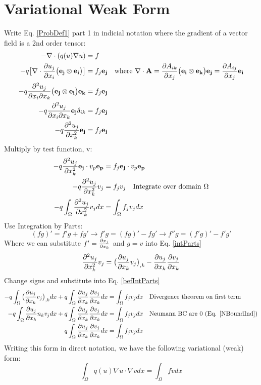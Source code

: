 \documentclass[12pt,3p]{article}
\begin{document}
\section{Variational Weak Form}
Write Eq. \ref{ProbDef1} part 1 in indicial notation where the gradient of a vector field is a 2nd order tensor: 
\begin{align*}
- \nabla \cdot (q(u) \nabla u ) &= f  \\
 - q \big[ \nabla \cdot \pdv{u_j}{x_i} \big( \mathbf{e_j} \otimes \mathbf{e_i} \big) \big] &= f_j \mathbf{e_j} \quad \text{where } \nabla \cdot \mathbf{A} = \pdv{A_{ik}}{x_j} \big( \mathbf{e_i} \otimes \mathbf{e_k} \big) \mathbf{e_j} = \pdv{A_{ij}}{x_j} \mathbf{e_i} \\
- q \pdv[2]{u_j}{x_i}{x_k} \big( \mathbf{e_j} \otimes \mathbf{e_i} \big) \mathbf{e_k} &= f_j \mathbf{e_j} \\
- q \pdv[2]{u_j}{x_i}{x_k} \mathbf{e_j} \delta_{ik} &= f_j \mathbf{e_j} \\
- q \pdv[2]{u_j}{x_k} \mathbf{e_j} &= f_j \mathbf{e_j} 
\end{align*}
Multiply by test function, v: 
\begin{align}\label{befIntParts}
\begin{split}
-q \pdv[2]{u_j}{x_k} \mathbf{e_j} \cdot v_p \mathbf{e_p} &= f_j \mathbf{e_j} \cdot v_p \mathbf{e_p} \\
 -q \pdv[2]{u_j}{x_k} v_j &= f_j v_j \quad \text{Integrate over domain } \Omega \\
 -q \int_{\Omega} \pdv[2]{u_j}{x_k} v_j dx &= \int_{\Omega} f_j v_j dx
\end{split}
\end{align}
Use Integration by Parts:
\begin{equation}\label{intParts}
(fg)' = f'g + fg' \rightarrow f'g = (fg)' - fg' \rightarrow f''g = (f'g)' - f'g'
\end{equation}
Where we can substitute $f'= \pdv{x_j}{x_k}$ and $g = v$ into Eq. \ref{intParts}
\begin{equation*}
\pdv[2]{u_j}{x_k} v_j = \big( \pdv{u_j}{x_k} v_j \big)_{,k} - \pdv{u_j}{x_k} \pdv{v_j}{x_k}
\end{equation*}
Change signs and substitute into Eq. \ref{befIntParts}
\begin{align}\label{befDiv}
\begin{split}
- q \int_{\Omega} \big( \pdv{u_j}{x_k} v_j \big)_{,k} dx + q \int_{\Omega} \pdv{u_j}{x_k} \pdv{v_j}{x_k} dx &= \int_{\Omega} f_j v_j dx \quad \text{Divergence theorem on first term} \\
- q \int_{\Omega} \pdv{u_j}{x_k} n_k v_j dx + q \int_{\Omega} \pdv{u_j}{x_k} \pdv{v_j}{x_k} dx &= \int_{\Omega} f_j v_j dx \quad \text{Neumann BC are 0 (Eq. \ref{NBoundInd})} \\
q \int_{\Omega} \pdv{u_j}{x_k} \pdv{v_j}{x_k} dx &= \int_{\Omega} f_j v_j dx
\end{split}
\end{align}
Writing this form in direct notation, we have the following variational (weak) form: 
\begin{equation}\label{weakForm}
\int_{\Omega} q(u) \nabla u \cdot \nabla vdx = \int_{\Omega} f v dx
\end{equation}
\end{document}
